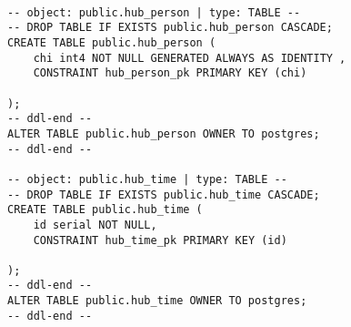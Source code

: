 \begin{lstlisting}

-- object: public.hub_person | type: TABLE --
-- DROP TABLE IF EXISTS public.hub_person CASCADE;
CREATE TABLE public.hub_person (
	chi int4 NOT NULL GENERATED ALWAYS AS IDENTITY ,
	CONSTRAINT hub_person_pk PRIMARY KEY (chi)

);
-- ddl-end --
ALTER TABLE public.hub_person OWNER TO postgres;
-- ddl-end --

-- object: public.hub_time | type: TABLE --
-- DROP TABLE IF EXISTS public.hub_time CASCADE;
CREATE TABLE public.hub_time (
	id serial NOT NULL,
	CONSTRAINT hub_time_pk PRIMARY KEY (id)

);
-- ddl-end --
ALTER TABLE public.hub_time OWNER TO postgres;
-- ddl-end --

\end{lstlisting}